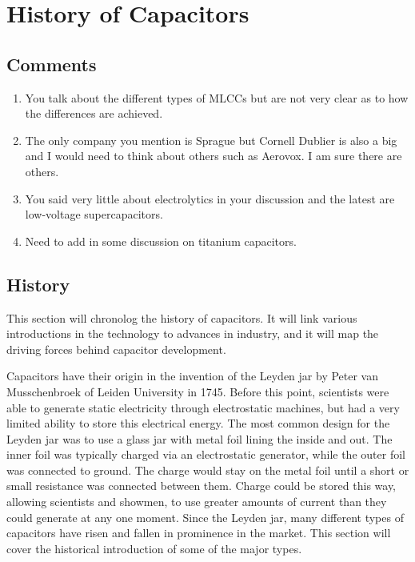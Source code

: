 \section {History of Capacitors}

\subsection{Comments}
\begin{enumerate}
    \item You talk about the different types of MLCCs but are not very clear as to how the differences are achieved.
    \item The only company you mention is Sprague but Cornell Dublier is also a big and I would need to think about others such as Aerovox.  I am sure there are others.
    \item You said very little about electrolytics in your discussion and the latest are low-voltage supercapacitors.
    \item Need to add in some discussion on titanium capacitors.
\end{enumerate}

\subsection{History}
This section will chronolog the history of capacitors. It will link various introductions in the technology to advances in industry, and it will map the driving forces behind capacitor development.

Capacitors have their origin in the invention of the Leyden jar by Peter van Musschenbroek of Leiden University in 1745.\cite{empLight} Before this point, scientists were able to generate static electricity through electrostatic machines, but had a very limited ability to store this electrical energy. 
\cite{ieee_hist} 
The most common design for the Leyden jar was to use a glass jar with metal foil lining the inside and out. The inner foil was typically charged via an electrostatic generator, while the outer foil was connected to ground. The charge would stay on the metal foil until a short or small resistance was connected between them. Charge could be stored this way, allowing scientists and showmen, to use greater amounts of current than they could generate at any one moment.
Since the Leyden jar, many different types of capacitors have risen and fallen in prominence in the market. This section will cover the historical introduction of some of the major types.


